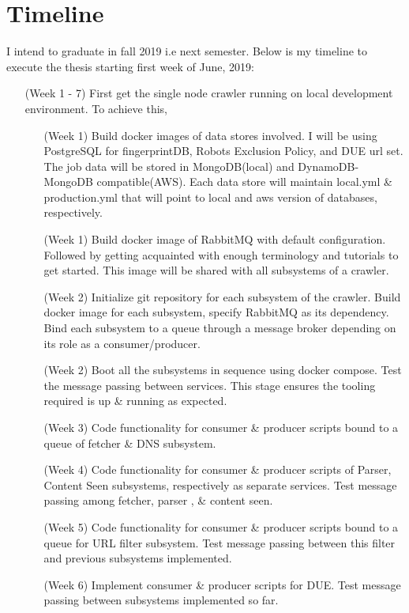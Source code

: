 \chapter{Timeline}
I intend to graduate in fall 2019 i.e next semester. Below is my timeline to execute the thesis starting
first week of June, 2019:
\begin{itemize}
\item[(Week 1 - 7)] First get the single node crawler running on local development environment. To achieve this,
  \begin{itemize}
  \item[(Week 1)] Build docker images of data stores involved. I will be using PostgreSQL for
    fingerprintDB, Robots Exclusion Policy, and DUE url set. The job data will be stored in MongoDB(local)
    and DynamoDB-MongoDB compatible(AWS). Each data store will maintain local.yml
    \& production.yml that will point to local and aws version of databases, respectively.
  \item[(Week 1)] Build docker image of RabbitMQ with default configuration. Followed by getting acquainted with enough terminology and tutorials to get started. This image will be shared with all subsystems of a
    crawler.
  \item [(Week 2)]Initialize git repository for each subsystem of the crawler. Build docker image for each subsystem,
    specify RabbitMQ as its dependency. Bind each subsystem to a queue through a message broker depending
    on its role as a consumer/producer.
  \item[(Week 2)] Boot all the subsystems in sequence using docker compose. Test the message passing between services. This stage ensures the tooling required is up \& running as expected.
  \item[(Week 3)] Code functionality for consumer \& producer scripts bound to a queue of fetcher \& DNS subsystem. 
  \item[(Week 4)] Code functionality for consumer \& producer scripts of Parser, Content Seen subsystems, respectively as separate services. Test message passing among fetcher, parser , \& content seen.
  \item[(Week 5)] Code functionality for consumer \& producer scripts bound to a queue for URL filter subsystem. Test message passing between this filter and previous subsystems implemented.
  \item[(Week 6)] Implement consumer \& producer scripts for DUE. Test message passing between subsystems implemented so far.

\end{itemize}
\end{itemize}
